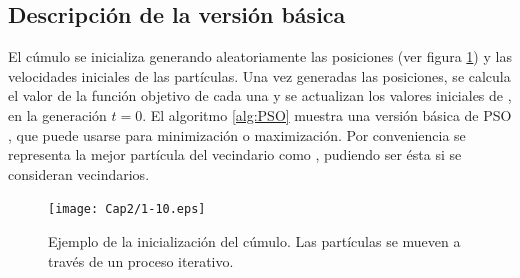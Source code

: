     \subsection{Descripci\'on de la versi\'on b\'asica}

    El c\'umulo se inicializa generando aleatoriamente las posiciones (ver figura \ref{fig:iniciacion}) y las velocidades iniciales de las part\'iculas. Una vez generadas 
    las posiciones, se calcula el valor de la funci\'on objetivo de cada una y se actualizan los valores iniciales de \DIFdelbegin {}\DIFdelend \DIFaddbegin {}\DIFaddend , en la 
    generaci\'on $t = 0$.  El algoritmo \ref{alg:PSO} muestra una versi\'on b\'asica de PSO \cite{JKennedySI}, que puede usarse para minimizaci\'on o 
    maximizaci\'on. Por conveniencia se representa la mejor part\'icula del vecindario como \DIFdelbegin {}\DIFdelend \DIFaddbegin {}\DIFaddend , pudiendo ser \'esta \DIFdelbegin {}\DIFdelend \DIFaddbegin {}\DIFaddend si se consideran vecindarios.

     \begin{figure}
	\centering
	\texttt{[image: Cap2/1-10.eps]}
	  \caption[Ejemplo de la inicializaci\'on del c\'umulo]{Ejemplo de la inicializaci\'on del c\'umulo. Las part\'iculas se mueven \DIFaddbeginFL {}\DIFaddendFL a trav\'es de un proceso iterativo.}
      \label{fig:iniciacion}
      \end{figure}

